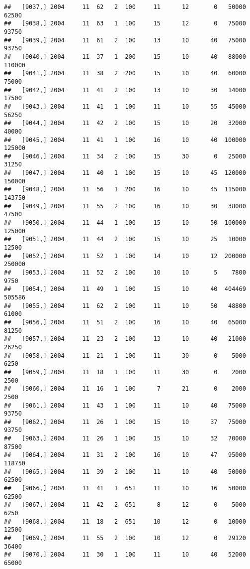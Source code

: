 \documentclass{article}\usepackage[]{graphicx}\usepackage[]{color}
\makeatletter
\newenvironment{kframe}{%
 \def\at@end@of@kframe{}%
 \ifinner\ifhmode%
  \def\at@end@of@kframe{\end{minipage}}%
  \begin{minipage}{\columnwidth}%
 \fi\fi%
 \def\FrameCommand##1{\hskip\@totalleftmargin \hskip-\fboxsep
 \colorbox{shadecolor}{##1}\hskip-\fboxsep
     \hskip-\linewidth \hskip-\@totalleftmargin \hskip\columnwidth}%
 \MakeFramed {\advance\hsize-\width
   \@totalleftmargin\z@ \linewidth\hsize
   \@setminipage}}%
 {\par\unskip\endMakeFramed%
 \at@end@of@kframe}
\newenvironment{knitrout}{}{} %
\makeatother
\begin{document}
\begin{knitrout}
\begin{kframe}
\begin{verbatim}
##   [9037,] 2004     11  62   2  100     11      12       0   50000   62500
##   [9038,] 2004     11  63   1  100     15      12       0   75000   93750
##   [9039,] 2004     11  61   2  100     13      10      40   75000   93750
##   [9040,] 2004     11  37   1  200     15      10      40   88000  110000
##   [9041,] 2004     11  38   2  200     15      10      40   60000   75000
##   [9042,] 2004     11  41   2  100     13      10      30   14000   17500
##   [9043,] 2004     11  41   1  100     11      10      55   45000   56250
##   [9044,] 2004     11  42   2  100     15      10      20   32000   40000
##   [9045,] 2004     11  41   1  100     16      10      40  100000  125000
##   [9046,] 2004     11  34   2  100     15      30       0   25000   31250
##   [9047,] 2004     11  40   1  100     15      10      45  120000  150000
##   [9048,] 2004     11  56   1  200     16      10      45  115000  143750
##   [9049,] 2004     11  55   2  100     16      10      30   38000   47500
##   [9050,] 2004     11  44   1  100     15      10      50  100000  125000
##   [9051,] 2004     11  44   2  100     15      10      25   10000   12500
##   [9052,] 2004     11  52   1  100     14      10      12  200000  250000
##   [9053,] 2004     11  52   2  100     10      10       5    7800    9750
##   [9054,] 2004     11  49   1  100     15      10      40  404469  505586
##   [9055,] 2004     11  62   2  100     11      10      50   48800   61000
##   [9056,] 2004     11  51   2  100     16      10      40   65000   81250
##   [9057,] 2004     11  23   2  100     13      10      40   21000   26250
##   [9058,] 2004     11  21   1  100     11      30       0    5000    6250
##   [9059,] 2004     11  18   1  100     11      30       0    2000    2500
##   [9060,] 2004     11  16   1  100      7      21       0    2000    2500
##   [9061,] 2004     11  43   1  100     11      10      40   75000   93750
##   [9062,] 2004     11  26   1  100     15      10      37   75000   93750
##   [9063,] 2004     11  26   1  100     15      10      32   70000   87500
##   [9064,] 2004     11  31   2  100     16      10      47   95000  118750
##   [9065,] 2004     11  39   2  100     11      10      40   50000   62500
##   [9066,] 2004     11  41   1  651     11      10      16   50000   62500
##   [9067,] 2004     11  42   2  651      8      12       0    5000    6250
##   [9068,] 2004     11  18   2  651     10      12       0   10000   12500
##   [9069,] 2004     11  55   2  100     10      12       0   29120   36400
##   [9070,] 2004     11  30   1  100     11      10      40   52000   65000

\end{verbatim}
\end{kframe}
\end{knitrout}
\end{document}
